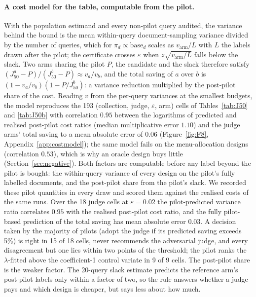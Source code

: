 \documentclass{article}
\newcommand{\eps}{\varepsilon}
\newcommand{\Jfifty}{J_{50}}
\begin{document}
\paragraph{A cost model for the table, computable from the pilot.} With the population estimand and every non-pilot query audited, the variance behind the bound is the mean within-query document-sampling variance divided by the number of queries, which for $\pi_d\propto\mathrm{base}_d$ scales as $v_{\text{arm}}/L$ with $L$ the labels drawn after the pilot; the certificate crosses $\eps$ when $z\sqrt{v_{\text{arm}}/L}$ falls below the slack. Two arms sharing the pilot $P$, the candidate and the slack therefore satisfy $(\Jfifty^{a}-P)/(\Jfifty^{b}-P)\approx v_a/v_b$, and the total saving of $a$ over $b$ is $(1-v_a/v_b)(1-P/\Jfifty^{b})$: a variance reduction multiplied by the post-pilot share of the cost. Reading $v$ from the per-query variances at the smallest budgets, the model reproduces the 193 (collection, judge, $\eps$, arm) cells of Tables~\ref{tab:J50} and \ref{tab:J50b} with correlation $0.95$ between the logarithms of predicted and realised post-pilot cost ratios (median multiplicative error $1.10$) and the judge arms' total saving to a mean absolute error of $0.06$ (Figure~\ref{fig:F8}, Appendix~\ref{app:costmodel}); the same model fails on the menu-allocation designs (correlation $0.53$), which is why an oracle design buys little (Section~\ref{sec:negative}). Both factors are computable before any label beyond the pilot is bought: the within-query variance of every design on the pilot's fully labelled documents, and the post-pilot share from the pilot's slack. We recorded these pilot quantities in every draw and scored them against the realised costs of the same runs. Over the 18 judge cells at $\eps=0.02$ the pilot-predicted variance ratio correlates $0.95$ with the realised post-pilot cost ratio, and the fully pilot-based prediction of the total saving has mean absolute error $0.03$. A decision taken by the majority of pilots (adopt the judge if its predicted saving exceeds 5\%) is right in 15 of 18 cells, never recommends the adversarial judge, and every disagreement but one lies within two points of the threshold; the pilot ranks the $\lambda$-fitted above the coefficient-1 control variate in 9 of 9 cells. The post-pilot share is the weaker factor. The 20-query slack estimate predicts the reference arm's post-pilot labels only within a factor of two, so the rule answers whether a judge pays and which design is cheaper, but says less about how much.
\end{document}
